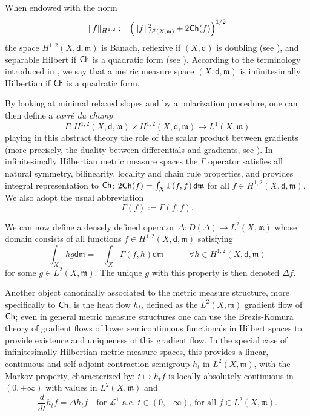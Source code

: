 \documentclass[a4paper,11pt,reqno]{article}
\numberwithin{equation}{section}
\theoremstyle{plain}
\theoremstyle{definition}
\theoremstyle{remark}
\newcommand{\Ch}{{\sf Ch}}
\newcommand{\leb}{\mathscr{L}}
\newcommand{\dist}{\mathsf{d}}
\newcommand{\meas}{\mathfrak{m}}
\begin{document}
When endowed with the norm
$$
\|f\|_{H^{1,2}}:=\left(\|f\|_{L^2(X,\meas)}^2+2\Ch(f)\right)^{1/2}
$$
the space $H^{1,2}(X,\dist,\meas)$ 
is Banach, reflexive if $(X,\dist)$ is doubling (see \cite{AmbrosioColomboDiMarino}), and  
separable Hilbert if $\Ch$ is a quadratic form (see \cite{AmbrosioGigliSavare14}). 
According to the terminology introduced in \cite{Gigli1}, we say that a 
metric measure space $(X,\dist,\meas)$ is infinitesimally Hilbertian if $\Ch$ is a quadratic form.
  
By looking at minimal relaxed slopes and by a polarization procedure, one can then define a {\it carr\'e du champ}
$$
\Gamma:H^{1,2}(X,\dist,\meas)\times H^{1,2}(X,\dist,\meas)\rightarrow L^1(X,\meas)
$$
playing in this abstract theory the role of the scalar product between gradients (more precisely,
the duality between differentials and gradients, see \cite{Gigli1}). In infinitesimally Hilbertian metric measure
spaces the $\Gamma$ operator
satisfies all natural symmetry, bilinearity, locality and chain rule properties, and provides integral representation to
$\Ch$: $2\Ch(f)=\int_X \Gamma(f,f)\,\dist\meas$ for all $f\in H^{1,2}(X,\dist,\meas)$. We also adopt the usual
abbreviation
$$
\Gamma(f):=\Gamma(f,f).
$$

We can now define a densely
defined operator $\Delta:D(\Delta)\to L^2(X,\meas)$ whose domain consists of all functions $f\in H^{1,2}(X,\dist,\meas)$
satisfying
$$
 \int_X hg\dist\meas=-\int_X \Gamma(f,h)\dist\meas\quad\qquad\forall h\in H^{1,2}(X,\dist,\meas)
$$
for some $g\in L^2(X,\meas)$. The unique $g$ with this property is then denoted $\Delta f$.

Another object canonically associated to the metric measure structure, more specifically to $\Ch$, is the heat flow $h_t$, defined as the
$L^2(X,\meas)$ gradient flow of $\Ch$; even in general metric measure structures one can use the Brezis-Komura theory of 
gradient flows of lower semicontinuous functionals in Hilbert spaces to provide existence and uniqueness of this gradient flow. 
In the special case of infinitesimally Hilbertian 
metric measure spaces, this provides a linear, continuous and self-adjoint contraction
semigroup $h_t$ in $L^2(X,\meas)$, with the Markov property, characterized by:
$t\mapsto h_t f$ is locally absolutely continuous in $(0,+\infty)$ with values in $L^2(X,\meas)$ and
$$
\frac{d}{dt}h_t f=\Delta h_t f\quad\text{for $\leb^1$-a.e. $t\in (0,+\infty)$, for all $f\in L^2(X,\meas)$.}
$$

%
\end{document}
